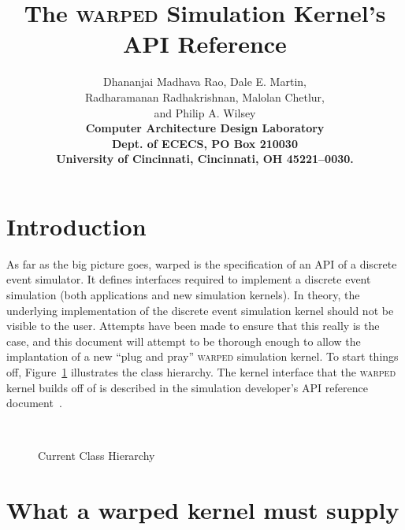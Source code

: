 




\title{\textbf{The \textsc{warped} Simulation Kernel's API Reference}} 

\author{ \textsf{Dhananjai Madhava Rao, Dale E. Martin,}\\
\textsf{Radharamanan Radhakrishnan, Malolan Chetlur,}\\ 
\textsf{and Philip A. Wilsey} \\
\textbf{Computer Architecture Design Laboratory} \\
\textbf{Dept. of ECECS, PO Box 210030} \\
\textbf{University of Cincinnati, Cincinnati, OH 45221--0030.}
}


\date{ }

\maketitle

\section{Introduction}

As far as the big picture goes, {\sc warped} is the specification of an
API of a discrete event simulator.  It defines interfaces required to
implement a discrete event simulation (both applications and new
simulation kernels).  In theory, the underlying implementation of the
discrete event simulation kernel should not be visible to the user.
Attempts have been made to ensure that this really is the case, and this
document will attempt to be thorough enough to allow the implantation of a
new ``plug and pray'' \textsc{warped} simulation kernel. To start things
off, Figure~\ref{fig:classHierarchy} illustrates the class hierarchy. The
kernel interface that the \textsc{warped} kernel builds off of is
described in the simulation developer's API reference
document~\cite{devel-api}.

\begin{figure}
\begin{center}
  \ 
\end{center}
\caption{Current Class Hierarchy}\label{fig:classHierarchy}
\end{figure}

\section{What a {\sc warped} kernel must supply}

